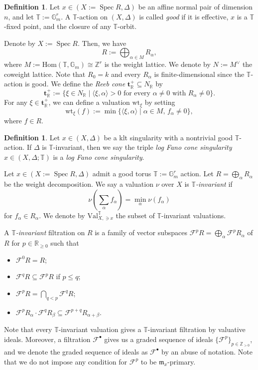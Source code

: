 \documentclass[a4paper,12pt]{amsart}
\theoremstyle{definition} %
\newtheorem{definition}[theorem]{Definition}
\theoremstyle{remark}
\numberwithin{equation}{section}
\newcommand{\R}{\mathbb{R}}
\newcommand{\Z}{\mathbb{Z}}
\def\Spec{\operatorname{Spec}}
\begin{document}
\begin{definition}
Let $x\in (X:=\Spec R,\Delta)$ be an affine normal pair of dimension $n$, and let $\mathbb{T}:=\mathbb{G}^r_m$. A $\mathbb{T}$-action on $(X,\Delta)$ is called \emph{good} if it is effective, $x$ is a $\mathbb{T}$-fixed point, and the closure of any $\mathbb{T}$-orbit.
\end{definition}

Denote by $X:=\Spec R$. Then, we have
$$ R:=\bigoplus_{\alpha\in M}R_{\alpha},$$
where $M:=\mathrm{Hom}(\mathbb{T},\mathbb{G}_m)\cong \Z^r$ is the weight lattice. We denote by $N:=M^{\vee}$ the coweight lattice. Note that $R_0=k$ and every $R_{\alpha}$ is finite-dimensional since the $\mathbb{T}$-action is good. We define the \emph{Reeb cone} $\mathbf{t}^+_{\R}\subseteq N_{\R}$ by
$$ \mathbf{t}^+_{\R}:=\{\xi\in N_{\R}\mid \langle \xi,\alpha\rangle >0\text{ for every }\alpha\ne 0\text{ with }R_{\alpha}\ne 0\}.$$
For any $\xi\in \mathbf{t}^+_{\R}$, we can define a valuation $\mathrm{wt}_{\xi}$ by setting
$$ \mathrm{wt}_{\xi}(f):=\min\{\langle \xi,\alpha\rangle \mid \alpha\in M,\,f_{\alpha}\ne 0\},$$
where $f\in R$.

\begin{definition}
Let $x\in (X,\Delta)$ be a klt singularity with a nontrivial good $\mathbb{T}$-action. If $\Delta$ is $\mathbb{T}$-invariant, then we say the triple \emph{log Fano cone singularity} $x\in (X,\Delta;\mathbb{T})$ is a \emph{log Fano cone singularity}.
\end{definition}

Let $x\in (X:=\Spec R,\Delta)$ admit a good torus $\mathbb{T}:=\mathbb{G}^r_m$ action. Let $R=\bigoplus_{\alpha}R_{\alpha}$ be the weight decomposition. We say a valuation $\nu$ over $X$ is $\mathbb{T}$\emph{-invariant} if
$$ \nu\left(\sum_{\alpha}f_{\alpha}\right)=\min_{\alpha}\nu(f_{\alpha})$$
for $f_{\alpha}\in R_{\alpha}$.
We denote by $\mathrm{Val}^{\mathbb{T}}_{X,\ni x}$ the subset of $\mathbb{T}$-invariant valuations.

\smallskip

A $\mathbb{T}$\emph{-invariant} filtration on $R$ is a family of vector subspaces $\mathcal{F}^{p}R=\bigoplus_{\alpha} \mathcal{F}^pR_{\alpha}$ of $R$ for $p\in \R_{\ge 0}$ such that
\begin{itemize}
    \item[(1)] $\mathcal{F}^0R=R$;
    \item[(2)] $\mathcal{F}^qR\subseteq \mathcal{F}^pR$ if $p\le q$;
    \item[(3)] $\mathcal{F}^pR=\bigcap_{q<p}\mathcal{F}^qR$;
    \item[(4)] $\mathcal{F}^pR_{\alpha}\cdot \mathcal{F}^qR_{\beta}\subseteq \mathcal{F}^{p+q}R_{\alpha+\beta}$.
\end{itemize}
Note that every $\mathbb{T}$-invariant valuation gives a $\mathbb{T}$-invariant filtration by valuative ideals. Moreover, a filtration $\mathcal{F}^{\bullet}$ gives us a graded sequence of ideals $\{\mathcal{F}^p\}_{p\in \Z_{>0}}$, and we denote the graded sequence of ideals as $\mathcal{F}^{\bullet}$ by an abuse of notation. Note that we do not impose any condition for $\mathcal{F}^p$ to be $\mathfrak{m}_x$-primary.
\end{document}
